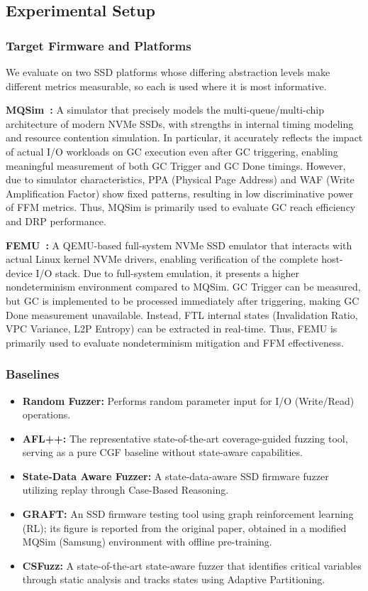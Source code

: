 \documentclass[conference]{IEEEtran}
\begin{document}
\subsection{Experimental Setup}
\subsubsection{Target Firmware and Platforms}
We evaluate on two SSD platforms whose differing abstraction levels make different metrics measurable, so each is used where it is most informative.

\textbf{MQSim~\cite{mqsim}:} A simulator that precisely models the multi-queue/multi-chip architecture of modern NVMe SSDs, with strengths in internal timing modeling and resource contention simulation.
In particular, it accurately reflects the impact of actual I/O workloads on GC execution even after GC triggering, enabling meaningful measurement of both GC Trigger and GC Done timings.
However, due to simulator characteristics, PPA (Physical Page Address) and WAF (Write Amplification Factor) show fixed patterns, resulting in low discriminative power of FFM metrics.
Thus, MQSim is primarily used to evaluate GC reach efficiency and DRP performance.

\textbf{FEMU~\cite{femu}:} A QEMU-based full-system NVMe SSD emulator that interacts with actual Linux kernel NVMe drivers, enabling verification of the complete host-device I/O stack.
Due to full-system emulation, it presents a higher nondeterminism environment compared to MQSim.
GC Trigger can be measured, but GC is implemented to be processed immediately after triggering, making GC Done measurement unavailable.
Instead, FTL internal states (Invalidation Ratio, VPC Variance, L2P Entropy) can be extracted in real-time.
Thus, FEMU is primarily used to evaluate nondeterminism mitigation and FFM effectiveness.

\subsubsection{Baselines}
\begin{itemize}
\item \textbf{Random Fuzzer:} Performs random parameter input for I/O (Write/Read) operations.
\item \textbf{AFL++:} The representative state-of-the-art coverage-guided fuzzing tool, serving as a pure CGF baseline without state-aware capabilities.
\item \textbf{State-Data Aware Fuzzer:} A state-data-aware SSD firmware fuzzer utilizing replay through Case-Based Reasoning.
\item \textbf{GRAFT:} An SSD firmware testing tool using graph reinforcement learning (RL); its figure is reported from the original paper, obtained in a modified MQSim (Samsung) environment with offline pre-training.
\item \textbf{CSFuzz:} A state-of-the-art state-aware fuzzer that identifies critical variables through static analysis and tracks states using Adaptive Partitioning.
\end{itemize}
\end{document}
